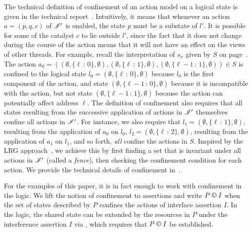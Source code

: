 The technical definition of confinement of an action model on a
logical state is given in the technical report~\cite{colosl-tr14}. Intuitively,
it means that whenever an action $a = (p, q, c)$ of
$\mathscr{I}'$ is enabled, the state $p$ must be a substate of $l'$.  It is
possible for some of the catalyst $c$ to lie outside $l'$, since the
fact that it does not change during the course of the action means
that it will not have an effect on the views of other threads.
For example, recall the interpretation of $s_x$ given by $S$ on
page~\pageref{ex:sxsem}. The action $a_0 = ((\emptyset, \{\ell\,{:}\,0\},
\emptyset), (\emptyset, \{\ell\,{:}\,1\}, \emptyset), (\emptyset,
\{\ell{-}1\,{:}\,1\}, \emptyset))\in S$ is confined to the logical state
$l_0=(\emptyset, \{\ell\,{:}\,0\}, \emptyset)$ because $l_0$ is the first component of the
action, and state $(\emptyset, \{\ell{-}1\,{:}\,0\}, \emptyset)$
because it  is incompatible with the
action, but not state $(\emptyset, \{\ell{-}1\,{:}\,1\}, \emptyset)$ because the action can
potentially affect address $\ell$.
%
The definition of confinement also requires that all states resulting from the successive application of actions in $\mathscr{I}'$ themselves confine all actions in $\mathscr{I}'$. For instance, we also require that $l_1 = (\emptyset, \{\ell\,{:}\,1\}, \emptyset)$,  resulting from the application of $a_0$ on $l_0$, $l_2 = (\emptyset, \{\ell\,{:}\,2\}, \emptyset)$, resulting from the application of $a_1$ on $l_1$, and so forth, \emph{all} confine the actions in $S$. 
Inspired by the LRG approach~\cite{lrg}, we achieve this by
first finding a set that is invariant under all actions in $\mathscr{I}'$
(called a \emph{fence}), then checking the confinement condition for
each action. We provide the technical details of confinement in~\cite{colosl-tr14}.

For the examples of this paper, it is in fact enough to work with confinement in the
logic. We lift the notion of confinement to assertions and write
$P \confines I$ when the set of states described by $P$
 confines the actions of interface assertion $I$.  In the logic, the
 shared state can be extended by the resources in
$P$ under the interference assertion $I$ via \extendRule,
which requires that $P\containI I$ be
established. 


